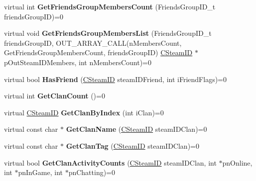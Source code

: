 \begin{DoxyCompactItemize}
virtual int {\bfseries Get\+Friends\+Group\+Members\+Count} (Friends\+Group\+I\+D\+\_\+t friends\+Group\+ID)=0
\item 
\mbox{\label{class_i_steam_friends_af941cfe1efee3d4ddd639fa65d640a4d}} 
virtual void {\bfseries Get\+Friends\+Group\+Members\+List} (Friends\+Group\+I\+D\+\_\+t friends\+Group\+ID, O\+U\+T\+\_\+\+A\+R\+R\+A\+Y\+\_\+\+C\+A\+LL(n\+Members\+Count, Get\+Friends\+Group\+Members\+Count, friends\+Group\+ID) \hyperlink{class_c_steam_i_d}{C\+Steam\+ID} $\ast$p\+Out\+Steam\+I\+D\+Members, int n\+Members\+Count)=0
\item 
\mbox{\label{class_i_steam_friends_a5eea1d17e8fd797dcee6920b61761e1c}} 
virtual bool {\bfseries Has\+Friend} (\hyperlink{class_c_steam_i_d}{C\+Steam\+ID} steam\+I\+D\+Friend, int i\+Friend\+Flags)=0
\item 
\mbox{\label{class_i_steam_friends_ad4bca073b32157360056818bf2bb8da7}} 
virtual int {\bfseries Get\+Clan\+Count} ()=0
\item 
\mbox{\label{class_i_steam_friends_a7be8e489ca359b4e9c665f62de5de6e3}} 
virtual \hyperlink{class_c_steam_i_d}{C\+Steam\+ID} {\bfseries Get\+Clan\+By\+Index} (int i\+Clan)=0
\item 
\mbox{\label{class_i_steam_friends_a2562ee2c900eb411257ad744d2829843}} 
virtual const char $\ast$ {\bfseries Get\+Clan\+Name} (\hyperlink{class_c_steam_i_d}{C\+Steam\+ID} steam\+I\+D\+Clan)=0
\item 
\mbox{\label{class_i_steam_friends_ad5457bd8e8bb800347e9d98691bc5ea9}} 
virtual const char $\ast$ {\bfseries Get\+Clan\+Tag} (\hyperlink{class_c_steam_i_d}{C\+Steam\+ID} steam\+I\+D\+Clan)=0
\item 
\mbox{\label{class_i_steam_friends_a9c1140ebd30409abe8eb2d396c41a08b}} 
virtual bool {\bfseries Get\+Clan\+Activity\+Counts} (\hyperlink{class_c_steam_i_d}{C\+Steam\+ID} steam\+I\+D\+Clan, int $\ast$pn\+Online, int $\ast$pn\+In\+Game, int $\ast$pn\+Chatting)=0
\item 
\mbox{\label{class_i_steam_friends_a2b708e391d8eb233790482892a4b2558}} 

\end{DoxyCompactItemize}
